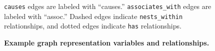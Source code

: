{\begin{figure}[h]
%
%
%
        \caption{\textbf{Example graph representation variables and relationships.}}
            \begin{small}
            \begin{minipage}{\linewidth}
                \texttt{causes} edges are labeled with ``causes.'' \texttt{associates\_with} edges are labeled with ``assoc.'' Dashed edges indicate \texttt{nests\_within} relationships, and dotted edges indicate \texttt{has} relationships.
            \end{minipage}
            \end{small}

\end{figure}}
